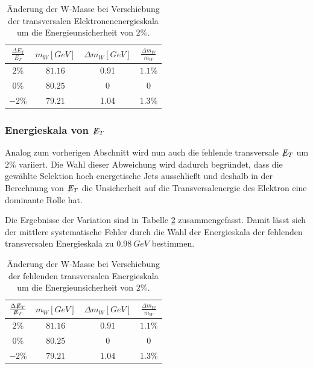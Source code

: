 \documentclass[a4paper,12pt]{article}
\newcommand{\met}{\ensuremath{\not\mathrel{E}}_T}
\begin{document}
\begin{table}[h]
	\centering
	\begin{tabular}{c| c c c}
		$\frac{\Delta E_{T}}{E_{T}}$ & $m_{W} [\si{GeV}]$ & $\Delta m_{W}[\si{GeV}]$ &$\frac{\Delta m_{W}}{m_{W}}$\\
		\hline
		$2\%$ & $81.16$ & 0.91 & $1.1\%$\\
		$0\%$ & $80.25$ & 0 & $0$ \\
		$-2\%$& $79.21$ & 1.04 &$1.3\%$
	\end{tabular}
	\caption{Änderung der W-Masse bei Verschiebung der transversalen Elektronenenergieskala um die
	Energieunsicherheit von $2\%$.}
	\label{tab:syset}
\end{table}
\subsubsection*{Energieskala von $\met$}
Analog zum vorherigen Abschnitt wird nun auch die fehlende transversale $\met$ um $2\%$  variiert. Die Wahl dieser Abweichung wird dadurch begründet, dass
die gewählte Selektion hoch energetische Jets ausschließt und deshalb in der Berechnung von $\met$ die Unsicherheit
auf die Transversalenergie des Elektron eine dominante Rolle hat.


Die Ergebnisse der Variation sind in Tabelle \ref{tab:sysmet} zusammengefasst. Damit lässt sich der mittlere systematische Fehler durch die
Wahl der Energieskala der fehlenden transversalen Energieskala zu $\SI{0.98}{GeV}$ bestimmen.
\begin{table}[h]
	\centering
	\begin{tabular}{c| c c c}
		$\frac{\Delta \met}{\met}$ & $m_{W} [\si{GeV}]$ & $\Delta m_{W}[\si{GeV}]$ &$\frac{\Delta m_{W}}{m_{W}}$\\
		\hline
		$2\%$ & $81.16$ & $0.91$ & $1.1\%$ \\
		$0\%$ & $80.25$ & $0$ & $0$ \\
		$-2\%$ & $79.21$ & $1.04$ &$1.3\%$
	\end{tabular}
	\caption{Änderung der W-Masse bei Verschiebung der fehlenden transversalen Energieskala um die
	Energieunsicherheit von $2\%$.}
	\label{tab:sysmet}
\end{table}
\end{document}
